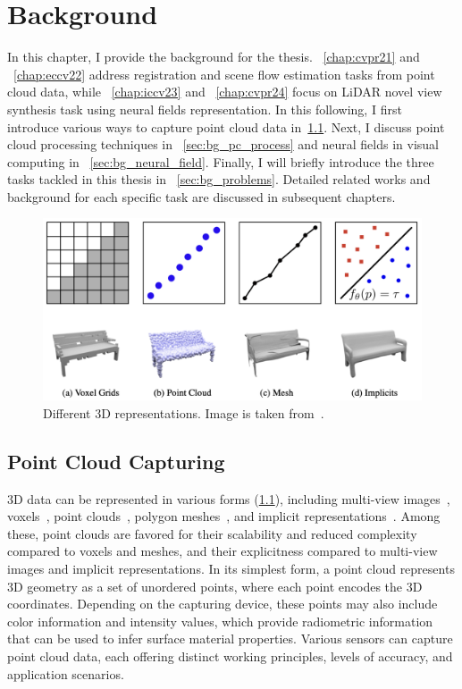 \chapter{Background}
\label{chap:background}

In this chapter, I provide the background for the thesis. ~\cref{chap:cvpr21} and ~\cref{chap:eccv22} address registration and scene flow estimation tasks from point cloud data, while ~\cref{chap:iccv23} and ~\cref{chap:cvpr24} focus on LiDAR novel view synthesis task using neural fields representation. In this following, I first introduce various ways to capture point cloud data in~\cref{sec:bg_pc_caputure}. Next, I discuss point cloud processing techniques in ~\cref{sec:bg_pc_process} and neural fields in visual computing in ~\cref{sec:bg_neural_field}. Finally, I will briefly introduce the three tasks tackled in this thesis in ~\cref{sec:bg_problems}. Detailed related works and background for each specific task are discussed in subsequent chapters.


\begin{figure}[t]
    \centering
    \includegraphics[width=1.0\columnwidth]{imgs/3d_representation.png}
    \caption{Different 3D representations. Image is taken from~\cite{mescheder2019occupancy}.}
    \label{fig:3d_representation}
\end{figure}


\section{Point Cloud Capturing}
\label{sec:bg_pc_caputure}
3D data can be represented in various forms (\cf \cref{fig:3d_representation}), including multi-view images~\cite{su2015multi,qi2016volumetric}, voxels~\cite{wu20153d,maturana2015voxnet}, point clouds~\cite{qi2017pointnet,wang2019dynamic}, polygon meshes~\cite{hanocka2019meshcnn,NEURIPS2020_0a656cc1}, and implicit representations~\cite{mescheder2019occupancy,park2019deepsdf,chen2019learning,yang2021geometry}. Among these, point clouds are favored for their scalability and reduced complexity compared to voxels and meshes, and their explicitness compared to multi-view images and implicit representations. In its simplest form, a point cloud represents 3D geometry as a set of unordered points, where each point encodes the 3D coordinates. Depending on the capturing device, these points may also include color information and intensity values, which provide radiometric information that can be used to infer surface material properties. Various sensors can capture point cloud data, each offering distinct working principles, levels of accuracy, and application scenarios.

